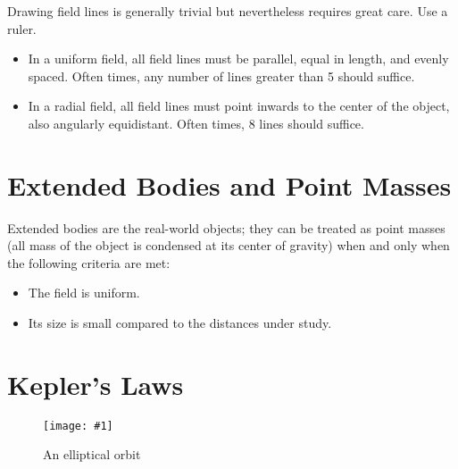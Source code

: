 \documentclass[a4paper,12pt]{article}
\let\oldsection\section
\renewcommand\section{\clearpage\oldsection}
\newcommand{\img}[4]{\begin{center}
  \begin{figure}[H]
    \centering
    \texttt{[image: \#1]}
    \caption{#3}
    \label{fig:#4}
  \end{figure}
\end{center}}
\begin{document}
Drawing field lines is generally trivial but nevertheless requires great care. Use a ruler.
\begin{itemize}
  \item In a uniform field, all field lines must be parallel, equal in length, and evenly spaced. Often times, any number of lines greater than 5 should suffice.
  \item In a radial field, all field lines must point inwards to the center of the object, also angularly equidistant. Often times, 8 lines should suffice.
\end{itemize}

\section{Extended Bodies and Point Masses}

Extended bodies are the real-world objects; they can be treated as point masses (all mass of the object is condensed at its center of gravity) when and only when the following criteria are met:
\begin{itemize}
  \item The field is uniform.
  \item Its size is small compared to the distances under study.
\end{itemize}

\section{Kepler's Laws}

\img{orbit.png}{0.9}{An elliptical orbit}{orbit}
\end{document}
